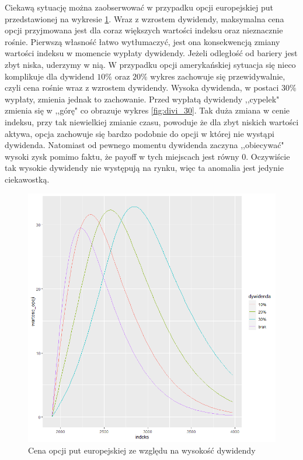 \documentclass[12pt]{article}
\begin{document}
Ciekawą sytuację można zaobserwować w przypadku opcji europejskiej put przedstawionej na wykresie \ref{fig:divi_wysokosc_put_EU}. Wraz z wzrostem dywidendy, maksymalna cena opcji przyjmowana jest dla coraz większych wartości indeksu oraz nieznacznie rośnie. Pierwszą własność łatwo wytłumaczyć, jest ona konsekwencją zmiany wartości indeksu w momencie wypłaty dywidendy. Jeżeli odległość od bariery jest zbyt niska, uderzymy w nią. W przypadku opcji amerykańskiej sytuacja się nieco komplikuje dla dywidend $10\%$ oraz $20\%$ wykres zachowuje się przewidywalnie, czyli cena rośnie wraz z wzrostem dywidendy. Wysoka dywidenda, w postaci $30\%$ wypłaty, zmienia jednak to zachowanie. Przed wypłatą dywidendy ,,cypelek" zmienia się w ,,górę" co obrazuje wykres \ref{fig:divi_30}. Tak duża zmiana w cenie indeksu, przy tak niewielkiej zmianie czasu, powoduje że dla zbyt niskich wartości aktywa, opcja zachowuje się bardzo podobnie do opcji w której nie wystąpi dywidenda. Natomiast od pewnego momentu dywidenda zaczyna ,,obiecywać" wysoki zysk pomimo faktu, że payoff w tych miejscach jest równy $0$. Oczywiście tak wysokie dywidendy nie występują na rynku, więc ta anomalia jest jedynie ciekawostką.
\begin{figure}[H]
    \centering
    \includegraphics[width=\textwidth,height=\textheight,keepaspectratio]{dividend/zmiennosc_dywidendy_put_EU.png}
    \caption{Cena opcji put europejskiej ze względu na wysokość dywidendy}
    \label{fig:divi_wysokosc_put_EU}
\end{figure}
\end{document}
